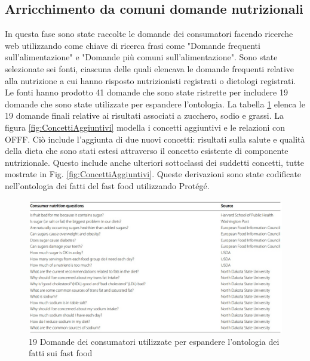 \subsection{Arricchimento da comuni domande nutrizionali}
In questa fase sono state raccolte le domande dei consumatori facendo ricerche web utilizzando come chiave di ricerca frasi come "Domande frequenti \\sull'alimentazione" e "Domande più comuni sull'alimentazione". Sono state selezionate sei fonti, ciascuna delle quali elencava le domande frequenti relative alla nutrizione a cui hanno risposto nutrizionisti registrati o dietologi registrati. Le fonti hanno prodotto 41 domande che sono state ristrette per includere 19 domande che sono state utilizzate per espandere l'ontologia.
La tabella \ref{fig:Questions} elenca le 19 domande finali relative ai risultati associati a zucchero, sodio e grassi.
La figura \ref{fig:ConcettiAggiuntivi} modella i concetti aggiuntivi e le relazioni con OFFF. Ciò include l'aggiunta di due nuovi concetti: risultati sulla salute e qualità della dieta che sono stati estesi attraverso il concetto esistente di componente nutrizionale.
Questo include anche ulteriori sottoclassi dei suddetti concetti, tutte mostrate in Fig. \ref{fig:ConcettiAggiuntivi}. Queste derivazioni sono state codificate nell'ontologia dei fatti del fast food utilizzando Protégé.

\begin{figure}[H]
    \centering
    \includegraphics[width=\textwidth]{res/WS_04_Questions.jpg}
    \caption{19 Domande dei consumatori utilizzate per espandere l'ontologia dei fatti sui fast food}
     \label{fig:Questions}
\end{figure}

